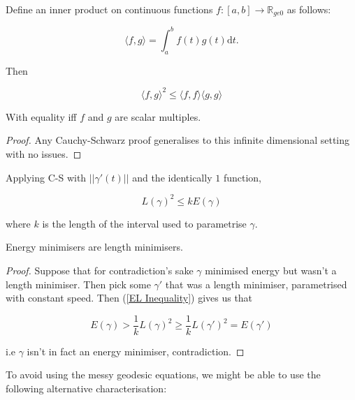 \documentclass[11pt]{scrartcl}
\begin{document}
\begin{proposition}

Define an inner product on continuous functions $f : [a, b] \rightarrow \mathbb{R}_{ge 0}$ as follows:

\begin{equation}
    \langle f, g \rangle = \int_a^b f(t) g(t) \mathrm{d}t.
\end{equation}

Then

\begin{equation}
    \langle f, g \rangle^2 \le \langle f,f \rangle \langle g,g \rangle
\end{equation}

With equality iff $f$ and $g$ are scalar multiples.

\begin{proof}
Any Cauchy-Schwarz proof generalises to this infinite dimensional setting with no issues.
\end{proof}
\end{proposition}

Applying C-S with $||\gamma'(t)||$ and the identically $1$ function,

\begin{equation}
    L(\gamma)^2 \le k E(\gamma)
\label{EL Inequality}
\end{equation}

where $k$ is the length of the interval used to parametrise $\gamma$. 
\begin{proposition}
Energy minimisers are length minimisers.

\begin{proof}
Suppose that for contradiction's sake $\gamma$ minimised energy but wasn't a length minimiser. Then pick some $\gamma'$ that was a length minimiser, parametrised with constant speed. Then (\ref{EL Inequality}) gives us that

\begin{equation}
    E(\gamma) > \frac1k L(\gamma)^2 \ge \frac1k L(\gamma')^2 = E(\gamma')
\end{equation}

i.e $\gamma$ isn't in fact an energy minimiser, contradiction.
\end{proof}
\end{proposition}

To avoid using the messy geodesic equations, we might be able to use the following alternative characterisation:
\end{document}

